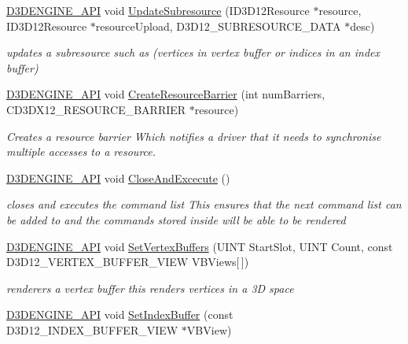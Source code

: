 \begin{DoxyCompactItemize}
\mbox{\hyperlink{stdafx_8h_a8ee2d990c5dfba7794dd2b60741d7722}{D3\+D\+E\+N\+G\+I\+N\+E\+\_\+\+A\+PI}} void \mbox{\hyperlink{class_command_list_manager_a443b5cd0b93f1bc3474bc24e9e2f6d6c}{Update\+Subresource}} (I\+D3\+D12\+Resource $\ast$resource, I\+D3\+D12\+Resource $\ast$resource\+Upload, D3\+D12\+\_\+\+S\+U\+B\+R\+E\+S\+O\+U\+R\+C\+E\+\_\+\+D\+A\+TA $\ast$desc)
\begin{DoxyCompactList}\small\item\em updates a subresource such as (vertices in vertex buffer or indices in an index buffer) \end{DoxyCompactList}\item 
\mbox{\hyperlink{stdafx_8h_a8ee2d990c5dfba7794dd2b60741d7722}{D3\+D\+E\+N\+G\+I\+N\+E\+\_\+\+A\+PI}} void \mbox{\hyperlink{class_command_list_manager_a2d7afa441d20a24e50a1891c46cfdd60}{Create\+Resource\+Barrier}} (int num\+Barriers, C\+D3\+D\+X12\+\_\+\+R\+E\+S\+O\+U\+R\+C\+E\+\_\+\+B\+A\+R\+R\+I\+ER $\ast$resource)
\begin{DoxyCompactList}\small\item\em Creates a resource barrier Which notifies a driver that it needs to synchronise multiple accesses to a resource. \end{DoxyCompactList}\item 
\mbox{\hyperlink{stdafx_8h_a8ee2d990c5dfba7794dd2b60741d7722}{D3\+D\+E\+N\+G\+I\+N\+E\+\_\+\+A\+PI}} void \mbox{\hyperlink{class_command_list_manager_a9b533c23910ad61ac969fb35fbfc2c82}{Close\+And\+Excecute}} ()
\begin{DoxyCompactList}\small\item\em closes and executes the command list This ensures that the next command list can be added to and the commands stored inside will be able to be rendered \end{DoxyCompactList}\item 
\mbox{\hyperlink{stdafx_8h_a8ee2d990c5dfba7794dd2b60741d7722}{D3\+D\+E\+N\+G\+I\+N\+E\+\_\+\+A\+PI}} void \mbox{\hyperlink{class_command_list_manager_a106aff91e2a78da34b7e90243b289cd6}{Set\+Vertex\+Buffers}} (U\+I\+NT Start\+Slot, U\+I\+NT Count, const D3\+D12\+\_\+\+V\+E\+R\+T\+E\+X\+\_\+\+B\+U\+F\+F\+E\+R\+\_\+\+V\+I\+EW V\+B\+Views\mbox{[}$\,$\mbox{]})
\begin{DoxyCompactList}\small\item\em renderers a vertex buffer this renders vertices in a 3D space \end{DoxyCompactList}\item 
\mbox{\hyperlink{stdafx_8h_a8ee2d990c5dfba7794dd2b60741d7722}{D3\+D\+E\+N\+G\+I\+N\+E\+\_\+\+A\+PI}} void \mbox{\hyperlink{class_command_list_manager_a1d31737c9ca7090659a9311df3b921f8}{Set\+Index\+Buffer}} (const D3\+D12\+\_\+\+I\+N\+D\+E\+X\+\_\+\+B\+U\+F\+F\+E\+R\+\_\+\+V\+I\+EW $\ast$V\+B\+View)

\end{DoxyCompactItemize}

